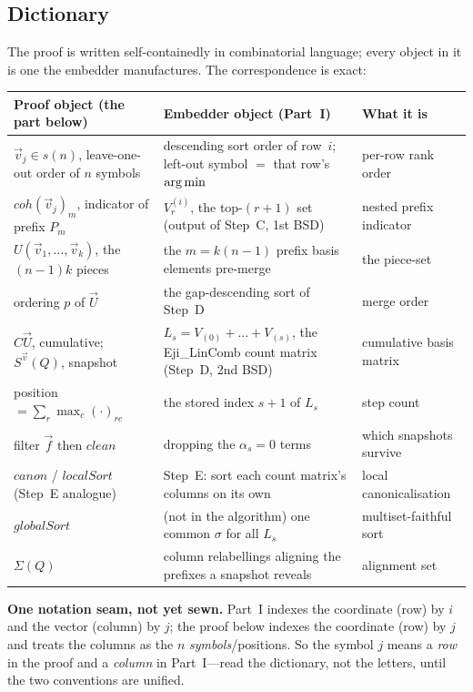 \subsection*{Dictionary}

The proof is written self-containedly in combinatorial language; every object
in it is one the embedder manufactures.  The correspondence is exact:

\begin{center}
\small
\setlength{\tabcolsep}{6pt}
\renewcommand{\arraystretch}{1.3}
\begin{tabular}{@{}p{6.1cm}p{5.0cm}p{3.6cm}@{}}
\toprule
\textbf{Proof object (the part below)} & \textbf{Embedder object (Part~I)} & \textbf{What it is} \\
\midrule
$\vec v_j\in s(n)$, leave-one-out order of $n$ symbols
  & descending sort order of row~$i$; left-out symbol $=$ that row's $\operatorname*{arg\,min}$
  & per-row rank order \\
$coh(\vec v_j)_m$, indicator of prefix $P_m$
  & $V^{(i)}_{r}$, the top-$(r{+}1)$ set (output of Step~C, 1st BSD)
  & nested prefix indicator \\
$U(\vec v_1,\dots,\vec v_k)$, the $(n{-}1)k$ pieces
  & the $m=k(n{-}1)$ prefix basis elements pre-merge
  & the piece-set \\
ordering $p$ of $\vec U$
  & the gap-descending sort of Step~D
  & merge order \\
$C\vec U$, cumulative; $S^{\vec v}(Q)$, snapshot
  & $L_s=V_{(0)}+\dots+V_{(s)}$, the Eji\_LinComb count matrix (Step~D, 2nd BSD)
  & cumulative basis matrix \\
position $=\sum_r\max_c(\cdot)_{rc}$
  & the stored index $s{+}1$ of $L_s$
  & step count \\
filter $\vec f$ then $clean$
  & dropping the $\alpha_s=0$ terms
  & which snapshots survive \\
$canon$ / $localSort$ (Step~E analogue)
  & Step~E: sort each count matrix's columns on its own
  & local canonicalisation \\
$globalSort$
  & (not in the algorithm) one common $\sigma$ for all $L_s$
  & multiset-faithful sort \\
$\Sigma(Q)$
  & column relabellings aligning the prefixes a snapshot reveals
  & alignment set \\
\bottomrule
\end{tabular}
\end{center}

\begin{tcolorbox}[notebox]
\textbf{One notation seam, not yet sewn.}  Part~I indexes the coordinate (row)
by $i$ and the vector (column) by $j$; the proof below indexes the coordinate
(row) by $j$ and treats the columns as the $n$ \emph{symbols}/positions.  So the
symbol $j$ means a \emph{row} in the proof and a \emph{column} in Part~I---read
the dictionary, not the letters, until the two conventions are unified.
\end{tcolorbox}

